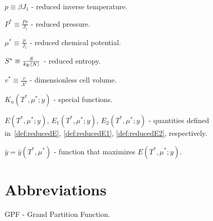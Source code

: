 $p \equiv \beta J_1$ - reduced inverse temperature.

$P^* \equiv \frac{Pv}{J_1}$ - reduced pressure.

$\mu^* \equiv \frac{\mu}{J_1}$ - reduced chemical potential.

$S^* \equiv \frac{S}{k_{\rm B} \langle N \rangle}$ - reduced entropy.

$v^* \equiv \frac{v}{\Lambda^3}$ - dimensionless cell volume.

$K_n(T^*,\mu^*;y)$ - special functions.

$E(T^*,\mu^*;y)$, $E_1(T^*,\mu^*;y)$, $E_2(T^*,\mu^*;y)$ - quantities defined in~\eqref{def:reducedE}, \eqref{def:reducedE1}, \eqref{def:reducedE2}, respectively.

$\bar{y} = \bar{y}(T^*,\mu^*)$ - function that maximizes $E(T^*,\mu^*;y)$.



\section*{Abbreviations}

GPF - Grand Partition Function.
